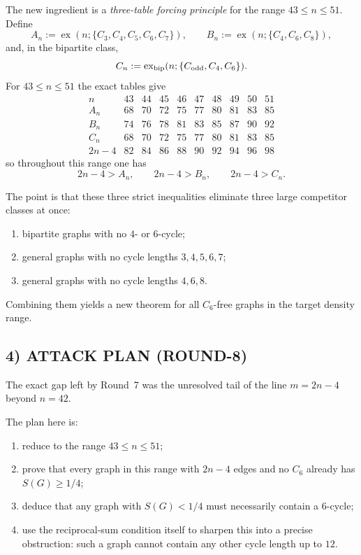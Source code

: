 The new ingredient is a \emph{three-table forcing principle} for the range $43\le n\le 51$.
Define
\[
A_n:=\operatorname{ex}(n;\{C_3,C_4,C_5,C_6,C_7\}),
\qquad
B_n:=\operatorname{ex}(n;\{C_4,C_6,C_8\}),
\]
and, in the bipartite class,
\[
C_n:=\operatorname{ex}_{\rm bip}(n;\{C_{\mathrm{odd}},C_4,C_6\}).
\]
For $43\le n\le 51$ the exact tables give
\[
\begin{array}{c|ccccccccc}
 n & 43&44&45&46&47&48&49&50&51\\\hline
 A_n & 68&70&72&75&77&80&81&83&85\\
 B_n & 74&76&78&81&83&85&87&90&92\\
 C_n & 68&70&72&75&77&80&81&83&85\\
 2n-4 & 82&84&86&88&90&92&94&96&98
\end{array}
\]
so throughout this range one has
\[
2n-4>A_n,\qquad 2n-4>B_n,\qquad 2n-4>C_n.
\]

The point is that these three strict inequalities eliminate three large competitor classes at once:
\begin{enumerate}
\item bipartite graphs with no $4$- or $6$-cycle;
\item general graphs with no cycle lengths $3,4,5,6,7$;
\item general graphs with no cycle lengths $4,6,8$.
\end{enumerate}
Combining them yields a new theorem for all $C_6$-free graphs in the target density range.

\subsection*{4) ATTACK PLAN (ROUND-8)}

The exact gap left by Round~7 was the unresolved tail of the line $m=2n-4$ beyond $n=42$.

The plan here is:
\begin{enumerate}
\item reduce to the range $43\le n\le 51$;
\item prove that every graph in this range with $2n-4$ edges and no $C_6$ already has $S(G)\ge 1/4$;
\item deduce that any graph with $S(G)<1/4$ must necessarily contain a $6$-cycle;
\item use the reciprocal-sum condition itself to sharpen this into a precise obstruction: such a graph cannot contain any other cycle length up to $12$.
\end{enumerate}

